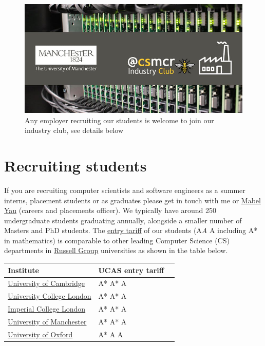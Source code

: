 \documentclass[
  12pt,
]{book}
\begin{document}
\begin{figure}

{\centering \includegraphics[width=1\linewidth]{images/industry-club-wide} 

}

\caption{Any employer recruiting our students is welcome to join our industry club, see details below}\label{fig:unnamed-chunk-2}
\end{figure}

\hypertarget{recruiting}{%
\section{Recruiting students}\label{recruiting}}

If you are recruiting computer scientists and software engineers as a summer interns, placement students or as graduates please get in touch with me or \href{https://uk.linkedin.com/in/mabel-yau}{Mabel Yau} (careers and placements officer). We typically have around 250 undergraduate students graduating annually, alongside a smaller number of Masters and PhD students. The \href{https://www.ucas.com/ucas/tariff-calculator}{entry tariff} of our students (A\emph{A} A including A* in mathematics) is comparable to other leading Computer Science (CS) departments in \href{https://en.wikipedia.org/wiki/Russell_Group}{Russell Group} universities as shown in the table below.

\begin{longtable}[]{@{}lll@{}}
\toprule
Institute & UCAS entry tariff &\tabularnewline
\midrule
\endhead
\href{https://www.undergraduate.study.cam.ac.uk/courses/computer-science}{University of Cambridge} & A* A* A &\tabularnewline
\href{https://www.ucl.ac.uk/prospective-students/undergraduate/degrees/computer-science-bsc/2020}{University College London} & A* A* A &\tabularnewline
\href{https://www.imperial.ac.uk/computing/prospective-students/courses/ug/beng-meng-computing/}{Imperial College London} & A* A* A &\tabularnewline
\href{https://www.manchester.ac.uk/study/undergraduate/courses/2019/00560/bsc-computer-science/}{University of Manchester} & A* A* A &\tabularnewline
\href{http://www.ox.ac.uk/admissions/undergraduate/courses-listing/computer-science}{University of Oxford} & A* A A &\tabularnewline
\bottomrule
\end{longtable}
\end{document}
